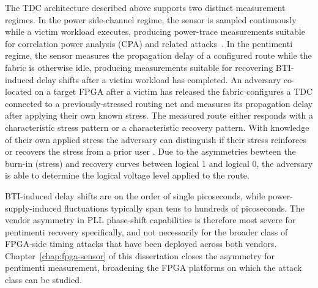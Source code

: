 The TDC architecture described above supports two distinct measurement
regimes. In the power side-channel regime, the sensor is sampled
continuously while a victim workload executes, producing power-trace
measurements suitable for correlation power analysis (CPA) and related
attacks~\cite{schellenberg2018remote, zhao2018fpga,
	clavier14_practical}. In the pentimenti regime, the sensor measures the
propagation delay of a configured route while the fabric is otherwise
idle, producing measurements suitable for recovering BTI-induced delay
shifts after a victim workload has completed. An adversary co-located on
a target FPGA after a victim has released the fabric configures a TDC
connected to a previously-stressed routing net and measures its
propagation delay after applying their own known stress. The measured
route either responds with a characteristic stress pattern or a
characteristic recovery pattern. With knowledge of their own applied
stress the adversary can distinguish if their stress reinforces or
recovers the stress from a prior user \cite{drewes2024pentimento}. Due
to the asymmetries bewteen the burn-in (stress) and recovery curves
between logical 1 and logical 0, the adversary is able to determine the
logical voltage level applied to the route.

BTI-induced delay shifts are on the order of single picoseconds, while
power-supply-induced fluctuations typically span tens to hundreds of
picoseconds. The vendor asymmetry in PLL phase-shift capabilities is
therefore most severe for pentimenti recovery specifically, and not
necessarily for the broader class of FPGA-side timing attacks that have
been deployed across both vendors. Chapter~\ref{chap:fpga-sensor} of
this dissertation closes the asymmetry for pentimenti measurement,
broadening the FPGA platforms on which the attack class can be studied.